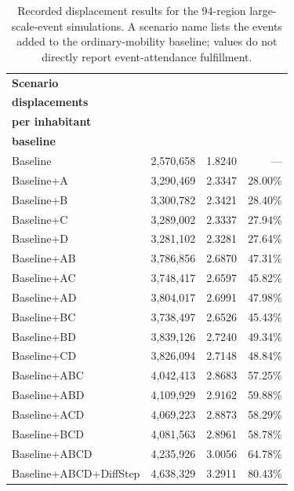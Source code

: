\begin{table}[ht]
\centering
\caption{Recorded displacement results for the 94-region large-scale-event simulations. A scenario name lists the events added to the ordinary-mobility baseline; values do not directly report event-attendance fulfillment.}
\label{tbl:large_scale_event_displacements_94}
\begin{tabular}{@{}lrrr@{}}
\toprule
\textbf{Scenario} & \shortstack{\textbf{Total}\\\textbf{displacements}} & \shortstack{\textbf{Displacements}\\\textbf{per inhabitant}} & \shortstack{\textbf{Increase over}\\\textbf{baseline}} \\
\midrule
Baseline               & 2,570,658 & 1.8240 & --- \\
\midrule
Baseline+A             & 3,290,469 & 2.3347 & 28.00\% \\
Baseline+B             & 3,300,782 & 2.3421 & 28.40\% \\
Baseline+C             & 3,289,002 & 2.3337 & 27.94\% \\
Baseline+D             & 3,281,102 & 2.3281 & 27.64\% \\
\midrule
Baseline+AB            & 3,786,856 & 2.6870 & 47.31\% \\
Baseline+AC            & 3,748,417 & 2.6597 & 45.82\% \\
Baseline+AD            & 3,804,017 & 2.6991 & 47.98\% \\
Baseline+BC            & 3,738,497 & 2.6526 & 45.43\% \\
Baseline+BD            & 3,839,126 & 2.7240 & 49.34\% \\
Baseline+CD            & 3,826,094 & 2.7148 & 48.84\% \\
\midrule
Baseline+ABC           & 4,042,413 & 2.8683 & 57.25\% \\
Baseline+ABD           & 4,109,929 & 2.9162 & 59.88\% \\
Baseline+ACD           & 4,069,223 & 2.8873 & 58.29\% \\
Baseline+BCD           & 4,081,563 & 2.8961 & 58.78\% \\
\midrule
Baseline+ABCD          & 4,235,926 & 3.0056 & 64.78\% \\
Baseline+ABCD+DiffStep & 4,638,329 & 3.2911 & 80.43\% \\
\bottomrule
\end{tabular}
\end{table}

